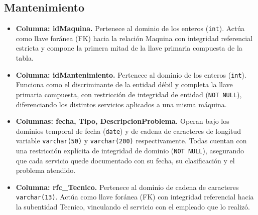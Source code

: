 \documentclass[11pt,letterpaper,spanish]{article}
\begin{document}
\subsection*{Mantenimiento}
\begin{itemize}
	\item \textbf{Columna: idMaquina.} Pertenece al dominio de los enteros (\texttt{int}). Actúa como llave foránea (FK) hacia la relación Maquina con integridad referencial estricta y compone la primera mitad de la llave primaria compuesta de la tabla.
	\item \textbf{Columna: idMantenimiento.} Pertenece al dominio de los enteros (\texttt{int}). Funciona como el discriminante de la entidad débil y completa la llave primaria compuesta, con restricción de integridad de entidad (\texttt{NOT NULL}), diferenciando los distintos servicios aplicados a una misma máquina.
	\item \textbf{Columnas: fecha, Tipo, DescripcionProblema.} Operan bajo los dominios temporal de fecha (\texttt{date}) y de cadena de caracteres de longitud variable \texttt{varchar(50)} y \texttt{varchar(200)} respectivamente. Todas cuentan con una restricción explícita de integridad de dominio (\texttt{NOT NULL}), asegurando que cada servicio quede documentado con su fecha, su clasificación y el problema atendido.
	\item \textbf{Columna: rfc\_Tecnico.} Pertenece al dominio de cadena de caracteres \texttt{varchar(13)}. Actúa como llave foránea (FK) con integridad referencial hacia la subentidad Tecnico, vinculando el servicio con el empleado que lo realizó.
\end{itemize}
\end{document}
